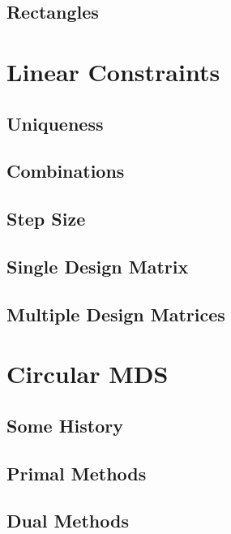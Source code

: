 \documentclass[
  12pt,
]{book}
\begin{document}
\subsection{Rectangles}\label{rectangles}

\section{Linear Constraints}\label{lincons}

\subsection{Uniqueness}\label{uniqueness}

\subsection{Combinations}\label{combinations}

\subsection{Step Size}\label{stepsize}

\subsection{Single Design Matrix}\label{singdesign}

\subsection{Multiple Design Matrices}\label{multdesign}

\section{Circular MDS}\label{circmds}

\subsection{Some History}\label{circhist}

\subsection{Primal Methods}\label{circprimal}

\subsection{Dual Methods}\label{circdual}
\end{document}
